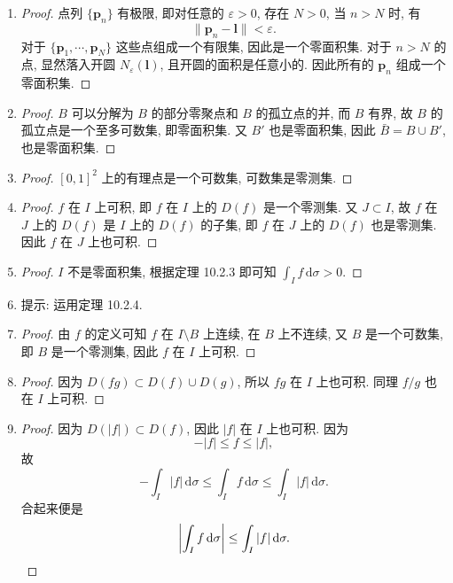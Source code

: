 \documentclass[a4paper, 11pt]{ctexart}
\begin{document}
\begin{enumerate}
    \item %
        \begin{proof}
            点列 $\{\boldsymbol{p}_n\}$ 有极限, 即对任意的 $\varepsilon > 0$, 存在 $N > 0$, 当 $n > N$ 时, 有
            \[
                \|\boldsymbol{p}_n - \boldsymbol{l}\| < \varepsilon.    
            \]
            对于 $\{\boldsymbol{p}_1,\cdots,\boldsymbol{p}_N\}$ 这些点组成一个有限集, 因此是一个零面积集.
            对于 $n>N$ 的点, 显然落入开圆 $N_\varepsilon(\boldsymbol{l})$, 且开圆的面积是任意小的.
            因此所有的 $\boldsymbol{p}_n$ 组成一个零面积集. 
        \end{proof}
    \item %
        \begin{proof}
            $B$ 可以分解为 $B$ 的部分零聚点和 $B$ 的孤立点的并, 而 $B$ 有界, 故 $B$ 的孤立点是一个至多可数集, 即零面积集. 又 $B'$ 也是零面积集,
            因此 $\bar{B} = B \cup B'$, 也是零面积集.
        \end{proof}
    \item %
        \begin{proof}
            $[0, 1]^2$ 上的有理点是一个可数集, 可数集是零测集.
        \end{proof}
    \item %
        \begin{proof}
            $f$ 在 $I$ 上可积, 即 $f$ 在 $I$ 上的 $D(f)$ 是一个零测集. 又 $J \subset I$, 故 $f$ 在 $J$ 上的 $D(f)$ 是 $I$ 上的 $D(f)$ 的子集,
            即 $f$ 在 $J$ 上的 $D(f)$ 也是零测集. 因此 $f$ 在 $J$ 上也可积.
        \end{proof}
    \item %
        \begin{proof}
            $I$ 不是零面积集, 根据定理 10.2.3 即可知 $\displaystyle{\int_I f\,\mathrm{d}\sigma > 0}$.
        \end{proof}
    \item %
        提示: 运用定理 10.2.4.
    \item %
        \begin{proof}
            由 $f$ 的定义可知 $f$ 在 $I \setminus B$ 上连续, 在 $B$ 上不连续, 又 $B$ 是一个可数集, 即 $B$ 是一个零测集, 因此 $f$ 在 $I$ 上可积.
        \end{proof}
    \item %
        \begin{proof}
            因为 $D(fg) \subset D(f) \cup D(g)$, 所以 $fg$ 在 $I$ 上也可积. 同理 $f/g$ 也在 $I$ 上可积.
        \end{proof}
    \item %
        \begin{proof}
            因为 $D(|f|) \subset D(f)$, 因此 $|f|$ 在 $I$ 上也可积. 因为
            \[
                -|f| \leq f \leq |f|,    
            \]
            故
            \[
                -\int_I|f|\,\mathrm{d}\sigma \leq \int_I f \,\mathrm{d}\sigma \leq \int_I|f|\,\mathrm{d}\sigma.    
            \]
            合起来便是
            \[
                \left|\int_If\,\mathrm{d}\sigma\right| \leq \int_I|f|\,\mathrm{d}\sigma. \qedhere    
            \]
        \end{proof}
\end{enumerate}
\end{document}

